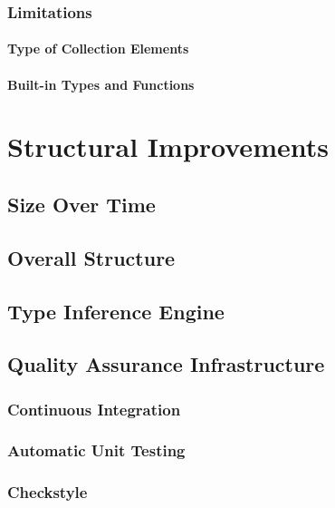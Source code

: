 \documentclass[12pt,halfparskip]{scrreprt}
\begin{document}
\subsection{Limitations}

\subsubsection{Type of Collection Elements}


\subsubsection{Built-in Types and Functions}


\chapter{Structural Improvements}


\section{Size Over Time}

\section{Overall Structure}


\section{Type Inference Engine}


\section{Quality Assurance Infrastructure}


\subsection{Continuous Integration}


\subsection{Automatic Unit Testing}


\subsection{Checkstyle}
\end{document}
